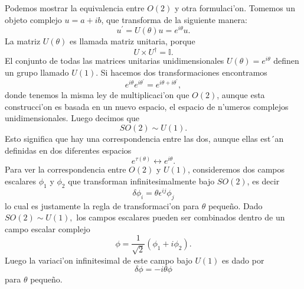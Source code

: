 Podemos mostrar la equivalencia entre $O(2)$ y otra formulaci'on. Tomemos un objeto complejo $u=a+ib$, que transforma de la siguiente manera:
\begin{equation}
u^\prime = U(\theta)u=e^{i\theta}u.
\end{equation}
La matriz $U(\theta)$ es llamada matriz unitaria, porque
\begin{equation}
U\times U^\dagger = \mathbb{I}.
\end{equation}
El conjunto de todas las matrices unitarias unidimensionales $U(\theta)=e^{i\theta}$ definen un grupo llamado $U(1)$. Si hacemos dos transformaciones encontramos
\begin{equation}
e^{i\theta}e^{i\theta^\prime}=e^{i\theta+i\theta^\prime},
\end{equation}
donde tenemos la misma ley de multiplicaci'on que $O(2)$, aunque esta construcci'on es basada en un nuevo espacio, el espacio de n'umeros complejos unidimensionales. Luego decimos que
\begin{equation}
SO(2)\sim U(1).
\end{equation}
Esto significa que hay una correspondencia entre las dos, aunque ellas est´an definidas en dos diferentes espacios
\begin{equation}
e^{\tau(\theta)}\leftrightarrow e^{i\theta}.
\end{equation}
Para ver la correspondencia entre $O(2)$ y $U(1)$, consideremos dos campos escalares $\phi_1$ y $\phi_2$ que transforman infinitesimalmente bajo $SO(2)$, es decir
\begin{equation}
\delta\phi_i = \theta \epsilon^{ij}\phi_j
\end{equation}
lo cual es justamente la regla de transformaci'on para $\theta$ peque\~no. Dado $SO(2) \sim U(1),$ los campos escalares pueden ser combinados dentro de un campo escalar complejo
\begin{equation}
\phi =\frac{1}{\sqrt{2}}\left(\phi_1+i\phi_2\right).
\end{equation}
Luego la variaci'on infinitesimal de este campo bajo $U(1)$ es dado por
\begin{equation}
\delta \phi =-i\theta \phi
\end{equation}
para $\theta$ peque\~no.



